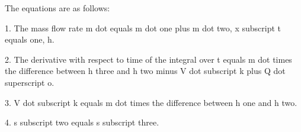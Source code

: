 The equations are as follows:

1. The mass flow rate m dot equals m dot one plus m dot two, x subscript t equals one, h.

2. The derivative with respect to time of the integral over t equals m dot times the difference between h three and h two minus V dot subscript k plus Q dot superscript o.

3. V dot subscript k equals m dot times the difference between h one and h two.

4. s subscript two equals s subscript three.